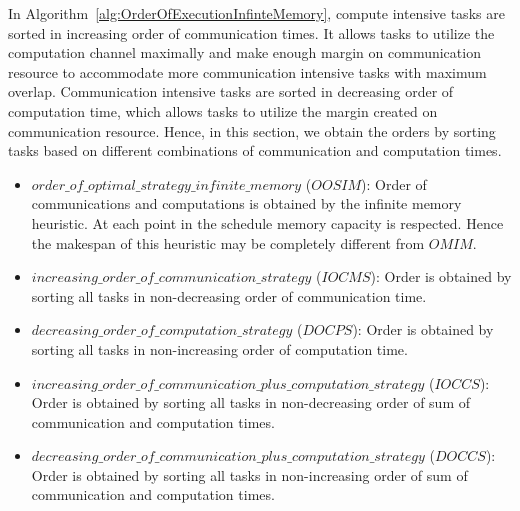 \documentclass[runningheads]{llncs} %
\begin{document}
In Algorithm~\ref{alg:OrderOfExecutionInfinteMemory}, compute intensive tasks  are sorted in increasing order of communication times. It allows tasks to utilize the computation channel maximally and make enough margin on communication resource to accommodate more communication intensive tasks with maximum overlap. Communication intensive tasks are sorted in decreasing order of computation time, which allows tasks to utilize the margin created on communication resource. Hence,  in this section, we obtain the orders by sorting tasks based on different combinations of communication and computation times.

\begin{itemize}[a)]
	\item $order\_of\_optimal\_strategy\_infinite\_memory $ ($OOSIM$): Order of communications and computations is obtained by the infinite memory heuristic. At each point in the schedule memory capacity is respected. Hence the makespan of this heuristic may be completely different from $OMIM$.
	
	\item $increasing\_order\_of\_communication\_strategy$ ($IOCMS$): Order is obtained by sorting all tasks in non-decreasing order of communication time. 
	
	\item $decreasing\_order\_of\_computation\_strategy$ ($DOCPS$): Order is obtained by sorting all tasks in non-increasing order of computation time. 
	\item $increasing\_order\_of\_communication\_plus\_computation\_strategy$ ($IOCCS$): Order is obtained by sorting all tasks in non-decreasing order of sum of communication and computation times.
	\item $decreasing\_order\_of\_communication\_plus\_computation\_strategy$ ($DOCCS$): Order is obtained by sorting all tasks in non-increasing order of sum of communication and computation times.
	
\end{itemize}
\end{document}
